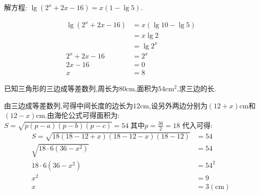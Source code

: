 \begin{questions}
	\question[8] 解方程:
	\begin{math}
		\lg(2^x + 2x - 16) = x(1-\lg5)
	\end{math}.
	\begin{solution}
		\begin{align*}
			\lg(2^x + 2x - 16) & = x(\lg10 - \lg5) \\
			                   & = x\lg2           \\
			                   & = \lg2^x          \\
			2^x + 2x - 16      & = 2^x             \\
			2x - 16            & = 0               \\
			x                  & = 8
		\end{align*}
	\end{solution}

	\question[8] 已知三角形的三边成等差数列,周长为$80$cm,面积为$54$cm$^2$,求三边的长.
	\begin{solution}



		由三边成等差数列,可得中间长度的边长为$12$cm,设另外两边分别为$(12+x)$cm和$(12-x)$cm.由海伦公式可得面积为:
		\begin{math}
			S = \sqrt{p(p-a)(p-b)(p-c)} = 54\; \text{其中} p = \frac{36}{2} = 18
		\end{math}
		代入可得:
		\begin{align*}
			S = \sqrt{18(18 - 12 + x)(18 - 12 - x)(18 - 12)} & = 54              \\
			\sqrt{18\cdot 6 (36-x^2)}                        & = 54              \\
			18\cdot 6 (36- x^2)                              & = 54^2            \\
			x^2                                              & = 9               \\
			x                                                & = 3 (\mathrm{cm})
		\end{align*}


\end{solution}
\end{questions}
